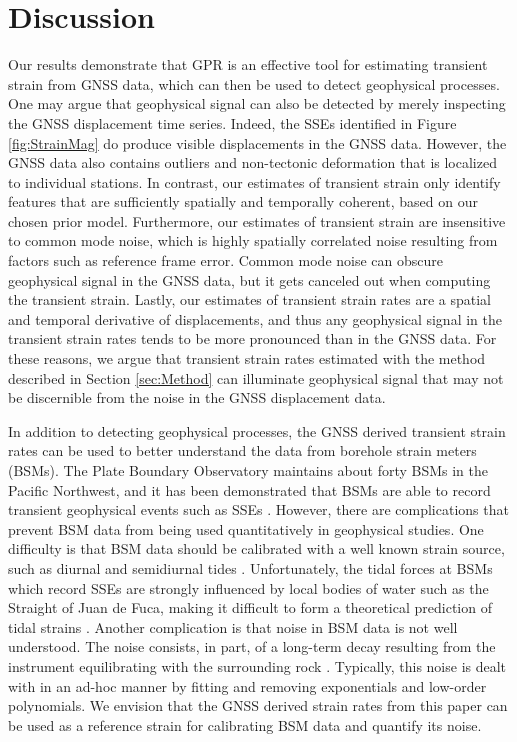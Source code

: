 \documentclass[extra,mreferee]{gji}
\begin{document}
\section{Discussion}\label{sec:Discussion}
Our results demonstrate that GPR is an effective tool for estimating
transient strain from GNSS data, which can then be used to detect
geophysical processes. One may argue that geophysical signal can also
be detected by merely inspecting the GNSS displacement time series.
Indeed, the SSEs identified in Figure \ref{fig:StrainMag} do produce
visible displacements in the GNSS data. However, the GNSS data also
contains outliers and non-tectonic deformation that is localized to
individual stations. In contrast, our estimates of transient strain
only identify features that are sufficiently spatially and temporally
coherent, based on our chosen prior model. Furthermore, our estimates
of transient strain are insensitive to common mode noise, which is
highly spatially correlated noise resulting from factors such as
reference frame error. Common mode noise can obscure geophysical
signal in the GNSS data, but it gets canceled out when computing the
transient strain. Lastly, our estimates of transient strain rates are
a spatial and temporal derivative of displacements, and thus any
geophysical signal in the transient strain rates tends to be more
pronounced than in the GNSS data. For these reasons, we argue that
transient strain rates estimated with the method described in Section
\ref{sec:Method} can illuminate geophysical signal that may not be
discernible from the noise in the GNSS displacement data.

In addition to detecting geophysical processes, the GNSS derived
transient strain rates can be used to better understand the data from
borehole strain meters (BSMs). The Plate Boundary Observatory
maintains about forty BSMs in the Pacific Northwest, and it has been
demonstrated that BSMs are able to record transient geophysical events
such as SSEs \citep[e.g.,][]{Dragert2011}. However, there are
complications that prevent BSM data from being used quantitatively in
geophysical studies. One difficulty is that BSM data should be
calibrated with a well known strain source, such as diurnal and
semidiurnal tides \citep{Hart1996,Roeloffs2010,Hodgkinson2013}.
Unfortunately, the tidal forces at BSMs which record SSEs are strongly
influenced by local bodies of water such as the Straight of Juan de
Fuca, making it difficult to form a theoretical prediction of tidal
strains \citep{Roeloffs2010}. Another complication is that noise in
BSM data is not well understood. The noise consists, in part, of a
long-term decay resulting from the instrument equilibrating with the
surrounding rock \citep{Gladwin1987}. Typically, this noise is dealt
with in an ad-hoc manner by fitting and removing exponentials and
low-order polynomials. We envision that the GNSS derived strain rates
from this paper can be used as a reference strain for calibrating BSM
data and quantify its noise.
\end{document}
